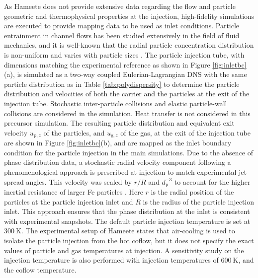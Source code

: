 \documentclass[twocolumn,9pt]{article} %
\newcommand{\blue}{}
\newcommand{\mrm}[1]{\mathrm{#1}}
\begin{document}
{\blue As Hameete \cite{hameetethesis} does not provide extensive data regarding the flow and particle geometric and thermophysical properties at the injection, high-fidelity simulations are executed to provide mapping data to be used as inlet conditions. Particle entrainment in channel flows has been studied extensively in the field of fluid mechanics, and it is well-known that the radial particle concentration distribution is non-uniform and varies with particle sizes \cite{lau2016effect}. The particle injection tube, with dimensions matching the experimental reference as shown in Figure \ref{fig:inletbc}(a), is simulated as a two-way coupled Eulerian-Lagrangian DNS with the same particle distribution as in Table \ref{tab:polydispersity} to determine the particle distribution and velocities of both the carrier and the particles at the exit of the injection tube. Stochastic inter-particle collisions and elastic particle-wall collisions are considered in the simulation. Heat transfer is not considered in this precursor simulation. The resulting particle distribution and equivalent exit velocity $u_{\mrm{p},z}$ of the particles, and $u_{\mrm{g},z}$ of the gas, at the exit of the injection tube are shown in Figure \ref{fig:inletbc}(b), and are mapped as the inlet boundary condition for the particle injection in the main simulations. Due to the absence of phase distribution data, a stochastic radial velocity component following a phenomenological approach is prescribed at injection to match experimental jet spread angles. This velocity was scaled by $r/R$  and $d_\mrm{p}^{-3}$ to account for the higher inertial resistance of larger Fe particles \cite{njue2021numerical}. Here $r$ is the radial position of the particles at the particle injection inlet and $R$ is the radius of the particle injection inlet. This approach ensures that the phase distribution at the inlet is consistent with experimental snapshots. {\blue The default particle injection temperature is set at $\SI{300}{\kelvin}$. The experimental setup of Hameete states that air-cooling is used to isolate the particle injection from the hot coflow, but it does not specify the exact values of particle and gas temperatures at injection. A sensitivity study on the injection temperature is also performed with injection temperatures of $\SI{600}{\kelvin}$, and the coflow temperature.}

}
\end{document}

